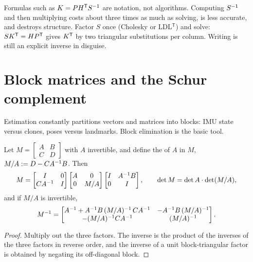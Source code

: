 \begin{pitfall}
Formulas such as $K = P H^{\mathsf{T}} S^{-1}$ are notation, not algorithms. Computing $S^{-1}$ and then multiplying costs about three times as much as
solving, is less accurate, and destroys structure. Factor $S$ once (Cholesky or LDL$^\mathsf{T}$) and solve: $S K^{\mathsf{T}} = H P^{\mathsf{T}}$ gives $K^{\mathsf{T}}$
by two triangular substitutions per column. Writing  is still an explicit inverse in disguise.
\end{pitfall}

\section{Block matrices and the Schur complement}
\label{sec:schur}

Estimation constantly partitions vectors and matrices into blocks: IMU state versus clones, poses versus landmarks. Block elimination is
the basic tool.

\begin{proposition}
\label{prop:block-inverse}
Let $M = \begin{bmatrix} A & B \\ C & D \end{bmatrix}$ with $A$ invertible, and define the  of $A$ in $M$,
$M/A := D - C A^{-1} B$. Then
\begin{equation}
  M = \begin{bmatrix} I & 0 \\ C A^{-1} & I \end{bmatrix}
      \begin{bmatrix} A & 0 \\ 0 & M/A \end{bmatrix}
      \begin{bmatrix} I & A^{-1} B \\ 0 & I \end{bmatrix},
  \qquad \det M = \det A \cdot \det(M/A),
\end{equation}
and if $M/A$ is invertible,
\begin{equation}
  M^{-1} = \begin{bmatrix}
    A^{-1} + A^{-1} B\, (M/A)^{-1}\, C A^{-1} & -A^{-1} B\, (M/A)^{-1} \\
    -(M/A)^{-1} C A^{-1} & (M/A)^{-1}
  \end{bmatrix}.
\end{equation}
\end{proposition}
\begin{proof}
Multiply out the three factors. The inverse is the product of the inverses of the three factors in reverse order, and the inverse of a
unit block-triangular factor is obtained by negating its off-diagonal block.
\end{proof}

